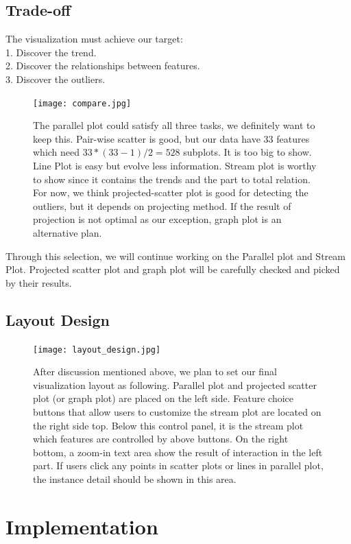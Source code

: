 \documentclass{article}
\begin{document}
\subsection{Trade-off}
The visualization must achieve our target:\\
1. Discover the trend. \\
2. Discover the relationships between features. \\
3. Discover the outliers.\\
\begin{figure}[H]
\centering
\texttt{[image: compare.jpg]}
\caption{The parallel plot could satisfy all three tasks, we definitely want to keep this. Pair-wise scatter is good, but our data have 33 features which need $33*(33-1)/2 = 528$ subplots. It is too big to show. Line Plot is easy but evolve less information. Stream plot is worthy to show since it contains the trends and the part to total relation. For now, we think projected-scatter plot is good for detecting the outliers, but it depends on projecting method. If the result of projection is not optimal as our exception, graph plot is an alternative plan.}
\end{figure}
Through this selection, we will continue working on the Parallel plot and Stream Plot. Projected scatter plot and graph plot will be carefully checked and picked by their results. 
\subsection{Layout Design}
\begin{figure}[H]
\centering
\texttt{[image: layout\_design.jpg]}
\caption{After discussion mentioned above, we plan to set our final visualization layout as following.  Parallel plot and projected scatter plot (or graph plot) are placed on the left side. Feature choice buttons that allow users to customize the stream plot are located on the right side top. Below this control panel, it is the stream plot which features are controlled by above buttons. On the right bottom, a zoom-in text area show the result  of interaction in the left part. If users click any points in scatter plots or lines in parallel plot, the instance detail should be shown in this area.}
\end{figure}

\section{Implementation}
\end{document}
